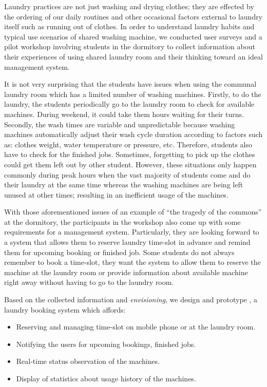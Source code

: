 Laundry practices are not just washing and drying clothes; they are effected by the ordering of
our daily routines \cite{shove2010beyond} and other occasional factors external to laundry itself such as running out of clothes. In order to understand laundry habits and typical use scenarios of shared washing machine, we conducted user surveys and a pilot workshop involving students in the dormitory to collect information about their experiences of using shared laundry room and their thinking toward an ideal management system.

It is not very surprising that the students have issues when using the communal laundry room which has a limited number of washing machines. Firstly, to do the laundry, the students periodically go to the laundry room to check for available machines. During weekend, it could take them hours waiting for their turns. Secondly, the wash times are variable and unpredictable because washing machines automatically adjust their wash cycle duration according to factors such as: clothes weight, water temperature or pressure, etc. Therefore, students also have to check for the finished jobs. Sometimes, forgetting to pick up the clothes could get them left out by other student. However, these situations only happen commonly during peak hours when the vast majority of students come and do their laundry at the same time whereas the washing machines are being left unused at other times; resulting in an inefficient usage of the machines.

With those aforementioned issues of an example of ``the tragedy of the commons'' at the dormitory, the participants in the workshop also come up with some requirements for a management system. Particularly, they are looking forward to a system that allows them to reserve laundry time-slot in advance and remind them for upcoming booking or finished job. Some students do not always remember to book a time-slot, they want the system to allow them to reserve the machine at the laundry room or provide information about available machine right away without having to go to the laundry room.

Based on the collected information and \emph{envisioning}, we design and prototype {\toolname}, a laundry booking system which affords:
\begin{itemize}
\item Reserving and managing time-slot on mobile phone or at the laundry room.
\item Notifying the users for upcoming bookings, finished jobs.
\item Real-time status observation of the machines.
\item Display of statistics about usage history of the machines.
\end{itemize}